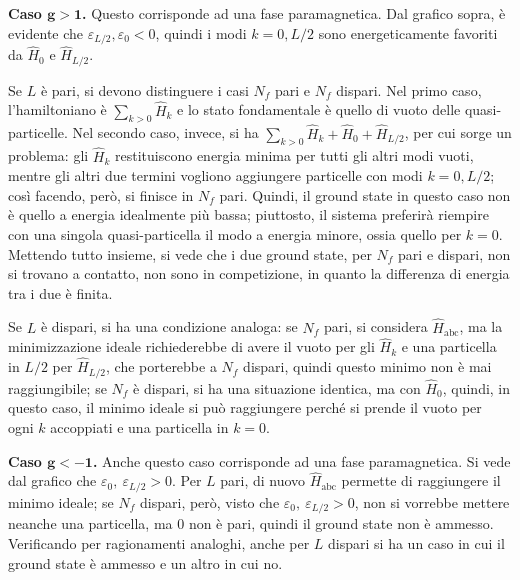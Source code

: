 \documentclass[11pt, a4paper]{scrartcl}
\theoremstyle{style}
\theoremstyle{style1}
\numberwithin{equation}{subsection}
\begin{document}
\textbf{Caso $\mathbf{g>1}$.} Questo corrisponde ad una fase paramagnetica.
Dal grafico sopra, \`e evidente che $\varepsilon _{L / 2} , \varepsilon _0 < 0$, quindi i modi $k=0, L / 2$ sono energeticamente favoriti da $\hat{H}_0$ e $\hat{H}_{L / 2} $.
		
		Se $L$ \`e pari, si devono distinguere i casi $N_f$ pari e $N_f$ dispari.
		Nel primo caso, l'hamiltoniano \`e $\sum_{k>0}^{} \hat{H}_k$ e lo stato fondamentale \`e quello di vuoto delle quasi-particelle.
		Nel secondo caso, invece, si ha $\sum_{k>0}^{} \hat{H}_k + \hat{H}_0 + \hat{H}_{ L / 2}$, per cui sorge un problema: gli $\hat{H}_k$ restituiscono energia minima per tutti gli altri modi vuoti, mentre gli altri due termini vogliono aggiungere particelle con modi $k=0,L / 2$; cos\`i facendo, per\`o, si finisce in $N_f$ pari.
		Quindi, il ground state in questo caso non \`e quello a energia idealmente pi\`u bassa; piuttosto, il sistema preferir\`a riempire con una singola quasi-particella il modo a energia minore, ossia quello per $k=0$.
		Mettendo tutto insieme, si vede che i due ground state, per $N_f$ pari e dispari, non si trovano a contatto, non sono in competizione, in quanto la differenza di energia tra i due \`e finita.

		Se $L$ \`e dispari, si ha una condizione analoga: se $N_f$ pari, si considera $\hat{H}_{\text{abc}} $, ma la minimizzazione ideale richiederebbe di avere il vuoto per gli $\hat{H}_k$ e una particella in $L / 2$ per $\hat{H}_{L / 2} $, che porterebbe a $N_f$ dispari, quindi questo minimo non \`e mai raggiungibile; se $N_f$ \`e dispari, si ha una situazione identica, ma con $\hat{H}_0$, quindi, in questo caso, il minimo ideale si pu\`o raggiungere perch\'e si prende il vuoto per ogni $k$ accoppiati e una particella in $k=0$. 
\vspace{.5cm}

\textbf{Caso $\mathbf{g<-1}$.} Anche questo caso corrisponde ad una fase paramagnetica. 
Si vede dal grafico che $\varepsilon _0, \ \varepsilon _{L / 2}  > 0$.
Per $L$ pari, di nuovo $\hat{H}_\text{abc}$ permette di raggiungere il minimo ideale; se $N_f$ dispari, per\`o, visto che $\varepsilon _0, \ \varepsilon _{L / 2}  > 0$, non si vorrebbe mettere neanche una particella, ma $0$ non \`e pari, quindi il ground state non \`e ammesso.
Verificando per ragionamenti analoghi, anche per $L$ dispari si ha un caso in cui il ground state \`e ammesso e un altro in cui no.
\vspace{.5cm}
\end{document}
